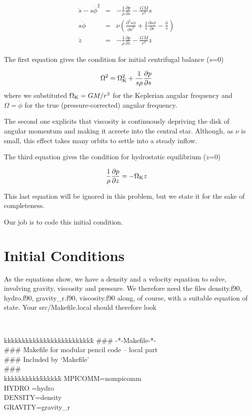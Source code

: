 \documentclass[a4paper,10pt]{article}
\newcommand{\pderiv}[2]{\frac{\partial #1}{\partial #2}}
\newcommand{\pderivn}[3]{\frac{{\partial{}}^{#3} #1}{{\partial #2}^{#3}}}
\begin{document}
\begin{eqnarray}
\ddot{s} - s{\dot{\phi}}^2 &=&  -\frac{1}{\rho}\pderiv{p}{s} - \frac{GM}{r^3}s\\ 
s\ddot{\phi}  &=&  \nu \left(\pderivn{s\dot\phi}{s}{2} + \frac{1}{s}\pderiv{s\dot{\phi}}{r} - \frac{\dot\phi}{s} \right)\\
\ddot{z}  &=& -\frac{1}{\rho}\pderiv{p}{z} - \frac{GM}{r^3}z 
\end{eqnarray}

The first equation gives the condition for initial centrifugal balance ($\ddot{s}$=0)

\begin{equation}
  \label{centrifugal}
  \Omega^2 = \Omega_{\rm K}^2 + \frac{1}{s\rho}\pderiv{p}{s} 
\end{equation}where we substituted $\Omega_{\rm K}=GM/r^3$ for the Keplerian angular frequency and $\Omega=\dot\phi$ for the true (pressure-corrected) angular frequency.

The second one explicits that viscosity is continuously depriving the disk of angular momentum and making it acreete into the central star. Although, as $\nu$ is small, this effect takes many orbits to settle into a steady inflow. 

The third equation gives the condition for hydrostatic equilibrium ($\ddot{z}$=0)

\begin{equation}
  \frac{1}{\rho}\pderiv{p}{z} = -\Omega_{\rm K} z 
\end{equation}

This last equation will be ignored in this problem, but we state it for the sake of completeness. 

Our job is to code this initial condition.

\section{Initial Conditions}

As the equations show, we have a density and a velocity equation to solve, involving gravity, viscosity and pressure. We therefore need the files density.f90, hydro.f90, gravity\_r.f90, viscosity.f90 along, of course, with a suitable equation of state. Your src/Makefile.local should therefore look


{\tt 
\begin{tabbing}
kkkkkkkkkkkkkkkkkkkkkkkkk\=\kill
\#\#\#  \>  -*-Makefile-*-\\
\#\#\# Makefile for modular pencil code -- local part\\
\#\#\# Included by `Makefile'\\
\#\#\#\\

kkkkkkkkkk\=kkkkkk\=\kill
MPICOMM\>=\>nompicomm\\
HYDRO  \>=\>hydro\\
DENSITY\>=\>density\\
GRAVITY\>=\>gravity\_r
\end{tabbing}
}
\end{document}
